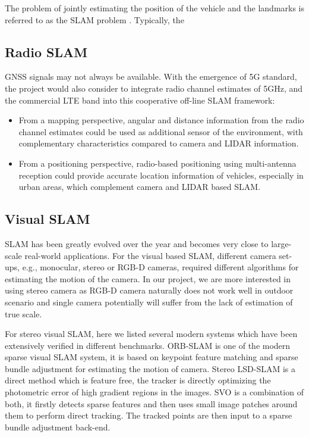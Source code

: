 The problem of jointly estimating the position of the vehicle and the landmarks is referred to as the \gls{SLAM} problem \cite{DBLP:journals/corr/CadenaCCLSN0L16}. Typically, the 

\subsection{Radio SLAM}

\gls{GNSS} signals may not always be available. With the emergence of 5G
standard, the project would also consider to integrate radio channel
estimates of 5GHz, and the commercial LTE
band into this cooperative off-line \gls{SLAM} framework:
\begin{itemize}
\item   From a mapping perspective, angular and distance information
  from the radio channel estimates could be used as additional sensor
  of the environment, with complementary characteristics compared to
  camera and LIDAR information.
\item From a positioning perspective, radio-based positioning using
multi-antenna reception could provide accurate location information of
vehicles, especially in urban areas, which complement camera and LIDAR
based SLAM.
\end{itemize}


\subsection{Visual SLAM}

\gls{SLAM} has been greatly evolved over the year and becomes very
close to large-scale real-world applications. For the visual based
\gls{SLAM}, different camera set-ups, e.g., monocular, stereo or RGB-D
cameras, required different algorithms for estimating the motion of
the camera. In our project, we are more interested in using stereo
camera as RGB-D camera naturally does not work well in outdoor scenario
and single camera potentially will suffer from the lack of estimation
of true scale.


For stereo visual \gls{SLAM}, here we listed several modern systems
which have been extensively verified in different
benchmarks. ORB-SLAM\cite{DBLP:journals/corr/Mur-ArtalT16a} is one of the modern sparse visual \gls{SLAM}
system, it is based on keypoint feature matching and sparse bundle
adjustment for estimating the motion of camera. Stereo LSD-SLAM\cite{7353631} is
a direct method which is feature free, the tracker is directly
optimizing the photometric error of  high gradient regions in the
images. SVO\cite{7782863} is a combination of both, it firstly detects sparse
features and then uses small image patches around them to perform
direct tracking. The tracked points are then input to a sparse bundle
adjustment back-end.

